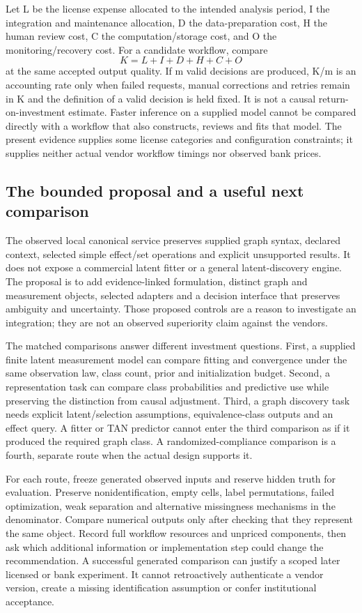Let L be the license expense allocated to the intended analysis period,
I the integration and maintenance allocation, D the data-preparation
cost, H the human review cost, C the computation/storage cost, and O the
monitoring/recovery cost. For a candidate workflow, compare \[
 K=L+I+D+H+C+O
\] at the same accepted output quality. If m valid decisions are
produced, K/m is an accounting rate only when failed requests, manual
corrections and retries remain in K and the definition of a valid
decision is held fixed. It is not a causal return-on-investment
estimate. Faster inference on a supplied model cannot be compared
directly with a workflow that also constructs, reviews and fits that
model. The present evidence supplies some license categories and
configuration constraints; it supplies neither actual vendor workflow
timings nor observed bank prices.

\hypertarget{the-bounded-proposal-and-a-useful-next-comparison}{%
\subsection{The bounded proposal and a useful next
comparison}\label{the-bounded-proposal-and-a-useful-next-comparison}}

The observed local canonical service preserves supplied graph syntax,
declared context, selected simple effect/set operations and explicit
unsupported results. It does not expose a commercial latent fitter or a
general latent-discovery engine. The proposal is to add evidence-linked
formulation, distinct graph and measurement objects, selected adapters
and a decision interface that preserves ambiguity and uncertainty. Those
proposed controls are a reason to investigate an integration; they are
not an observed superiority claim against the vendors.

The matched comparisons answer different investment questions.
First, a supplied finite latent measurement model can compare fitting
and convergence under the same observation law, class count, prior and
initialization budget. Second, a representation task can compare class
probabilities and predictive use while preserving the distinction from
causal adjustment. Third, a graph discovery task needs explicit
latent/selection assumptions, equivalence-class outputs and an effect
query. A fitter or TAN predictor cannot enter the third comparison as if
it produced the required graph class. A randomized-compliance comparison
is a fourth, separate route when the actual design supports it.

For each route, freeze generated observed inputs and reserve hidden
truth for evaluation. Preserve nonidentification, empty cells, label
permutations, failed optimization, weak separation and alternative
missingness mechanisms in the denominator. Compare numerical outputs
only after checking that they represent the same object. Record full
workflow resources and unpriced components, then ask which additional
information or implementation step could change the recommendation. A
successful generated comparison can justify a scoped later licensed or
bank experiment. It cannot retroactively authenticate a vendor version,
create a missing identification assumption or confer institutional
acceptance.
